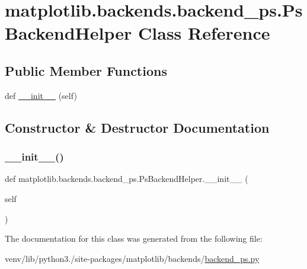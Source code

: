 \hypertarget{classmatplotlib_1_1backends_1_1backend__ps_1_1PsBackendHelper}{}\section{matplotlib.\+backends.\+backend\+\_\+ps.\+Ps\+Backend\+Helper Class Reference}
\label{classmatplotlib_1_1backends_1_1backend__ps_1_1PsBackendHelper}
\subsection*{Public Member Functions}
\begin{DoxyCompactItemize}
\item 
def \hyperlink{classmatplotlib_1_1backends_1_1backend__ps_1_1PsBackendHelper_aac861d53f650017b50d66938f7db1f30}{\+\_\+\+\_\+init\+\_\+\+\_\+} (self)
\end{DoxyCompactItemize}


\subsection{Constructor \& Destructor Documentation}
\mbox{\label{classmatplotlib_1_1backends_1_1backend__ps_1_1PsBackendHelper_aac861d53f650017b50d66938f7db1f30}} 
\subsubsection{\texorpdfstring{\+\_\+\+\_\+init\+\_\+\+\_\+()}{\_\_init\_\_()}}
{\footnotesize\ttfamily def matplotlib.\+backends.\+backend\+\_\+ps.\+Ps\+Backend\+Helper.\+\_\+\+\_\+init\+\_\+\+\_\+ (\begin{DoxyParamCaption}\item[{}]{self }\end{DoxyParamCaption})}



The documentation for this class was generated from the following file\+:\begin{DoxyCompactItemize}
\item 
venv/lib/python3./site-\/packages/matplotlib/backends/\hyperlink{backend__ps_8py}{backend\+\_\+ps.\+py}\end{DoxyCompactItemize}
